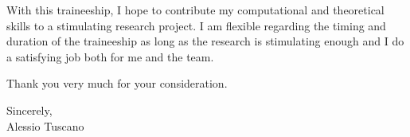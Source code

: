 \documentclass[a4paper,11pt]{article}
\begin{document}
With this traineeship, I hope to contribute my computational and theoretical skills to a stimulating research project. I am flexible regarding the timing and duration of the traineeship as long as the research is stimulating enough and I do a satisfying job both for me and the team.

Thank you very much for your consideration.


\vspace{1em}
\noindent
Sincerely,\\[.4em]
Alessio Tuscano
\end{document}
